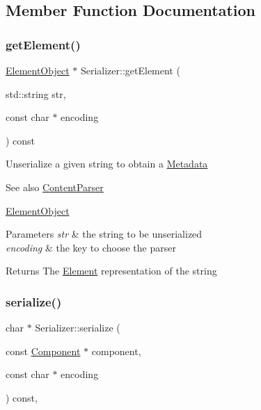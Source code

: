 \subsection{Member Function Documentation}
\mbox{\label{classSerializer_ab3bcdbd49167109de13e03878337018a}} 
\subsubsection{\texorpdfstring{get\+Element()}{getElement()}}
{\footnotesize\ttfamily \mbox{\hyperlink{classElementObject}{Element\+Object}} $\ast$ Serializer\+::get\+Element (\begin{DoxyParamCaption}\item[{std\+::string}]{str,  }\item[{const char $\ast$}]{encoding }\end{DoxyParamCaption}) const\hspace{0.3cm}{\ttfamily [inherited]}}

Unserialize a given string to obtain a \mbox{\hyperlink{classMetadata}{Metadata}} \begin{DoxySeeAlso}{See also}
\mbox{\hyperlink{classContentParser}{Content\+Parser}} 

\mbox{\hyperlink{classElementObject}{Element\+Object}}
\end{DoxySeeAlso}

\begin{DoxyParams}{Parameters}
{\em str} & the string to be unserialized \\
\hline
{\em encoding} & the key to choose the parser \\
\hline
\end{DoxyParams}
\begin{DoxyReturn}{Returns}
The \mbox{\hyperlink{classElement}{Element}} representation of the string 
\end{DoxyReturn}
\mbox{\label{classSerializer_a5cfe31eb70f4d0c92f2d68c22f39e885}} 
\subsubsection{\texorpdfstring{serialize()}{serialize()}\hspace{0.1cm}{\footnotesize\ttfamily [1/2]}}
{\footnotesize\ttfamily char $\ast$ Serializer\+::serialize (\begin{DoxyParamCaption}\item[{const \mbox{\hyperlink{classComponent}{Component}} $\ast$}]{component,  }\item[{const char $\ast$}]{encoding }\end{DoxyParamCaption}) const\hspace{0.3cm}{\ttfamily [virtual]}, {\ttfamily [inherited]}}

